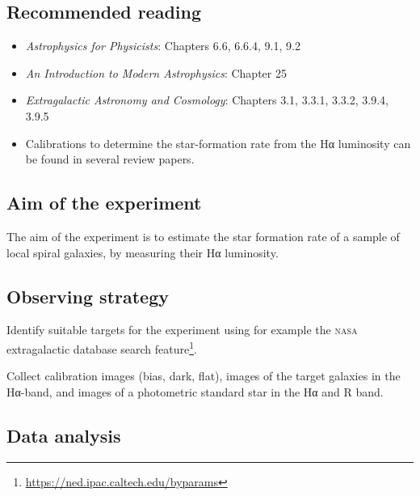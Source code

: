 \documentclass[a4paper, 11pt, fleqn]{memoir}
\begin{document}
\subsection{Recommended reading}
\begin{itemize}
    \item \emph{Astrophysics for Physicists}\autocite{Choudhuri}: Chapters 6.6, 6.6.4, 9.1, 9.2
    \item \emph{An Introduction to Modern Astrophysics}\autocite{carroll2017introduction}: Chapter 25
    \item \emph{Extragalactic Astronomy and Cosmology}\autocite{Schneider2006ExtragalacticAstronomy}: Chapters 3.1, 3.3.1, 3.3.2, 3.9.4, 3.9.5
    \item Calibrations to determine the star-formation rate from the Hα luminosity can be found in several review papers.\autocite{StarFormationCalzetti2013,StarFormationGonzalez2002} %
\end{itemize}

\subsection{Aim of the experiment}

The aim of the experiment is to estimate the star formation rate of a sample of local spiral galaxies, by measuring their Hα luminosity.


\subsection{Observing strategy}
Identify suitable targets for the experiment using for example the \textsc{nasa} extragalactic database search feature\footnote{\url{https://ned.ipac.caltech.edu/byparams}}.

Collect calibration images (bias, dark, flat), images of the target galaxies in the Hα-band, and images of a photometric standard star in the Hα and R band.

\subsection{Data analysis}
\end{document}
